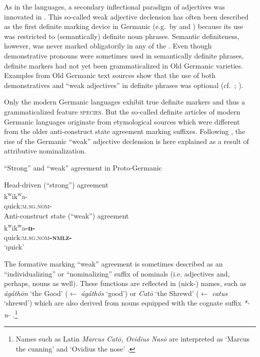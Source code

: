 As in the  languages, a secondary inflectional paradigm of adjectives was innovated in . This so-called weak adjective declension has often been described as the first definite marking device in Germanic (e.g.~by \citealt{heinrichs1954} and \citealt[170]{ringe2006}) because its use was restricted to (semantically) definite noun phrases. Semantic definiteness, however, was never marked obligatorily in any of the . Even though demonstrative pronouns were sometimes used in semantically definite phrases, definite markers had not yet been grammaticalized in Old Germanic varieties. Examples from Old Germanic text sources show that the use of both demonstratives and “weak adjectives” in definite phrases was optional (cf.~\citealt{philippi1997}; \citealt{heinrichs1954}).

Only the modern Germanic languages exhibit true definite markers and thus a grammaticalized feature \textsc{species}. But the so-called definite articles of modern Germanic languages originate from etymological sources which were different from the older anti\hyp{}construct state agreement marking suffixes. Following \citet[267–268]{riesler2006a}, the rise of the Germanic “weak” adjective declension is here explained as a result of attributive nominalization. 
\begin{exe}
\ex \rm{“Strong” and “weak” agreement in Proto\hyp{}Germanic \citep[169]{ringe2006}}
\begin{xlist}
\ex \rm{Head\hyp{}driven (“strong”) agreement}\\
\gll *k\textsuperscript{w}ik\textsuperscript{w}a-\\
	quick:\textsc{m.sg.nom-}\\
\ex \rm{Anti\hyp{}construct state (“weak”) agreement}\\
\gll *k\textsuperscript{w}ik\textsuperscript{w}a\textbf{-n-}\\
	quick:\textsc{m.sg.nom}\textbf{\textsc{-nmlz-}}\\
\glt	‘quick’
\end{xlist}
\end{exe}
The  formative marking “weak” agreement is sometimes described as an “individualizing” or “nominalizing” suffix of nominals (i.e. adjectives and, perhaps, nouns as well). These functions are reflected in (nick-) names, such as  \textit{ágáthōn} ‘the Good’ ($\leftarrow$ \textit{ágáthós} ‘good’) or  \textit{Catō} ‘the Shrewd’ ($\leftarrow$ \textit{catus} ‘shrewd’) which are also derived from nouns equipped with the cognate suffix \textit{*-n-} \citep[170]{ringe2006}.\footnote{Names such as Latin \textit{Marcus Catō, Ovidius Nasō} are interpreted as ‘Marcus the cunning’ and ‘Ovidius the nose’ \citep[6–7]{nocentini1996}.}

